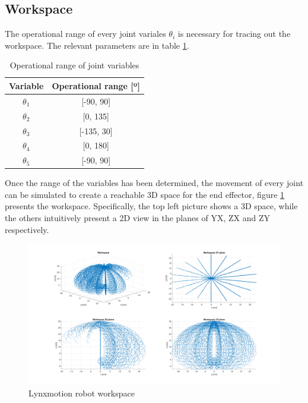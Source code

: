 \documentclass{article}
\begin{document}
\subsection{Workspace}
The operational range of every joint variales $\theta_i$ is necessary for tracing out the workspace.  The relevant parameters are in table \ref{tab:workspace.range}.

\begin{table}[h!]
\centering
\begin{tabular}{ c | c }
Variable		& Operational range [º]\\ \hline
$\theta_1$	& [-90, 90]\\
$\theta_2$	& [0, 135]\\
$\theta_3$	& [-135, 30]\\
$\theta_4$	& [0, 180]\\
$\theta_5$	& [-90, 90]
\end{tabular}
\caption{Operational range of joint variables}
\label{tab:workspace.range}
\end{table}

Once the range of the variables has been determined, the movement of every joint can be simulated to create a reachable 3D space for the end effector, figure \ref{fig:workpace.workspace} presents the workspace. Specifically, the top left picture shows a 3D space, while the others intuitively present a 2D view in the planes of YX, ZX and ZY respectively.

\begin{figure}[htbp]
\begin{center}
\includegraphics[width=\textwidth]{images/Workspace}
\caption{Lynxmotion robot workspace}
\label{fig:workpace.workspace}
\end{center}
\end{figure}
\end{document}
